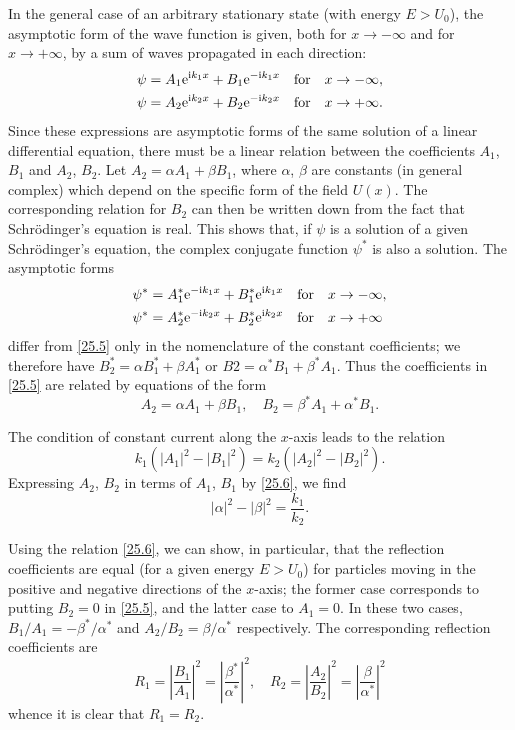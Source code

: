 In the general case of an arbitrary stationary state (with energy $ E > U_0 $), the asymptotic form of the wave function is given, both for $ x \to-\infty $ and for $ x \to+\infty $, by a sum of waves propagated in each direction:
\begin{equation}\label{25.5}
\begin{split}
\psi&=A_1\mathrm{e}^{\mathrm{i} k_1x}+B_1\mathrm{e}^{-\mathrm{i} k_1x}\quad\text{for}\quad x\to-\infty,\\
\psi&=A_2\mathrm{e}^{\mathrm{i} k_2x}+B_2\mathrm{e}^{-\mathrm{i} k_2x}\quad\text{for}\quad x\to+\infty.
\end{split}
\end{equation}
Since these expressions are asymptotic forms of the same solution of a linear differential equation, there must be a linear relation between the coefficients $ A_1 $, $ B_1 $ and $ A_2 $, $ B_2 $. Let $ A_2 =\alpha A_1 + \beta B_1 $, where $\alpha$, $\beta$ are constants (in general complex) which depend on the specific form of the field $ U (x) $. The corresponding relation for $ B_2 $ can then be written down from the fact that Schr\"odinger's equation is real. This shows that, if $\psi$ is a solution of a given Schr\"odinger's equation, the complex conjugate function $\psi^*$ is also a solution. The asymptotic forms
\begin{equation*}
\begin{split}
\psi^*&=A_1^*\mathrm{e}^{-\mathrm{i} k_1x}+B_1^*\mathrm{e}^{\mathrm{i} k_1x}\quad\text{for}\quad x\to-\infty,\\
\psi^*&=A_2^*\mathrm{e}^{-\mathrm{i} k_2x}+B_2^*\mathrm{e}^{\mathrm{i} k_2x}\quad\text{for}\quad x\to+\infty
\end{split}
\end{equation*}
differ from \eqref{25.5} only in the nomenclature of the constant coefficients; we therefore have $ B_2^* = \alpha B_1^* + \beta A_1^* $ or $ B2 = \alpha^*B_1 + \beta^*A_1 $. Thus the coefficients in \eqref{25.5} are related by equations of the form
\begin{equation}\label{25.6}
A_2=\alpha A_1+\beta B_1,\quad B_2=\beta^*A_1+\alpha^*B_1.
\end{equation}


The condition of constant current along the $ x $-axis leads to the relation
\[ k_1(|A_1|^2-|B_1|^2)=k_2(|A_2|^2-|B_2|^2). \]
Expressing $ A_2 $, $ B_2 $ in terms of $ A_1 $, $ B_1 $ by \eqref{25.6}, we find
\begin{equation}\label{25.7}
|\alpha|^2-|\beta|^2=\frac{k_1}{k_2}.
\end{equation}


Using the relation \eqref{25.6}, we can show, in particular, that the reflection coefficients are equal (for a given energy $ E > U_0 $) for particles moving in the positive and negative directions of the $ x $-axis; the former case corresponds to putting $ B_2 = 0 $ in \eqref{25.5}, and the latter case to $ A_1 = 0 $. In these two cases, $ B_1/A_1 = −\beta^*/\alpha^* $ and $ A_2/B_2 = \beta/\alpha^* $ respectively. The corresponding reflection coefficients are
\[ R_1=\left|\frac{B_1}{A_1} \right|^2=\left|\frac{\beta^*}{\alpha^*}\right|^2,\quad R_2=\left|\frac{A_2}{B_2}\right|^2=\left|\frac{\beta}{\alpha^*}\right|^2 \]
whence it is clear that $ R_1 = R_2 $.


